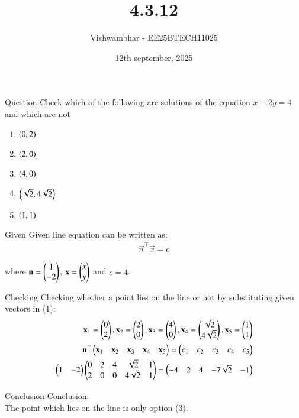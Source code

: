 \documentclass{beamer}
\title{4.3.12}
\date{12th september, 2025}
\author{Vishwambhar - EE25BTECH11025}
\begin{document}
\frame{\titlepage}
\begin{frame}{Question}
Check which of the following are solutions of the equation $x-2y=4$ and which are not\\
\begin{enumerate}
    \item $\left(0,2\right)$
    \item $\left(2,0\right)$
    \item $\left(4,0\right)$
    \item $\left(\sqrt{2},4\sqrt{2}\right)$
    \item $\left(1,1\right)$
\end{enumerate}
\end{frame}

\begin{frame}{Given}
Given line equation can be written as:
\begin{align}
    \vec{n}^\top\vec{x}=c
\end{align}

where $\mathbf{n}=\begin{pmatrix}1\\-2\end{pmatrix}$, $\mathbf{x}=\begin{pmatrix}x\\y\end{pmatrix}$ and $c=4$.\\
\end{frame}

\begin{frame}{Checking}
Checking whether a point lies on the line or not by substituting given vectors in (1):
\begin{align}
    \mathbf{x}_1=\begin{pmatrix}0\\2\end{pmatrix}, \mathbf{x}_2=\begin{pmatrix}2\\0\end{pmatrix}, \mathbf{x}_3=\begin{pmatrix}4\\0\end{pmatrix}, \mathbf{x}_4=\begin{pmatrix}\sqrt{2}\\4\sqrt{2}\end{pmatrix}, \mathbf{x}_5=\begin{pmatrix}1\\1\end{pmatrix}\\
    \mathbf{n}^\top\begin{pmatrix}\mathbf{x}_1&\mathbf{x}_2&\mathbf{x}_3&\mathbf{x}_4&\mathbf{x}_5\end{pmatrix}=\begin{pmatrix}c_1&c_2&c_3&c_4&c_5\end{pmatrix}\\
    \begin{pmatrix}1&-2\end{pmatrix}\begin{pmatrix}0&2&4&\sqrt{2}&1\\2&0&0&4\sqrt{2}&1\end{pmatrix}=\begin{pmatrix}-4&2&4&-7\sqrt{2}&-1\end{pmatrix}\\
\end{align}

\end{frame}

\begin{frame}{Conclusion}
Conclusion:\\

The point which lies on the line is only option (3).
\end{frame}
\end{document}
